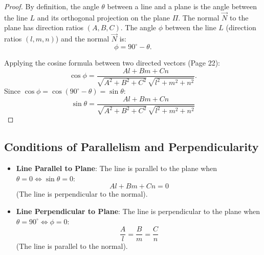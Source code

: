 \begin{proof}
By definition, the angle $\theta$ between a line and a plane is the angle between the line $L$ and its orthogonal projection on the plane $\Pi$.
The normal $\vec{N}$ to the plane has direction ratios $(A, B, C)$.
The angle $\phi$ between the line $L$ (direction ratios $(l, m, n)$) and the normal $\vec{N}$ is:
\begin{equation}
    \phi = 90^\circ - \theta.
\end{equation}

\begin{center}
\end{center}

Applying the cosine formula between two directed vectors (Page 22):
\begin{equation}
    \cos\phi = \frac{Al + Bm + Cn}{\sqrt{A^2 + B^2 + C^2}\,\sqrt{l^2 + m^2 + n^2}}.
\end{equation}
Since $\cos\phi = \cos(90^\circ - \theta) = \sin\theta$:
\begin{equation}
    \boxed{\sin\theta = \frac{Al + Bm + Cn}{\sqrt{A^2 + B^2 + C^2}\,\sqrt{l^2 + m^2 + n^2}}}
\end{equation}
\end{proof}

\subsection{Conditions of Parallelism and Perpendicularity}
\begin{itemize}
    \item \textbf{Line Parallel to Plane}: The line is parallel to the plane when $\theta = 0 \iff \sin\theta = 0$:
    \begin{equation}
        \boxed{Al + Bm + Cn = 0}
    \end{equation}
    (The line is perpendicular to the normal).
    \item \textbf{Line Perpendicular to Plane}: The line is perpendicular to the plane when $\theta = 90^\circ \iff \phi = 0$:
    \begin{equation}
        \boxed{\frac{A}{l} = \frac{B}{m} = \frac{C}{n}}
    \end{equation}
    (The line is parallel to the normal).
\end{itemize}

